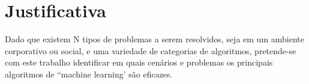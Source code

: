 \section{Justificativa}
\label{sec:justificativa}

Dado que existem N tipos de problemas a serem resolvidos, seja em um ambiente corporativo ou social, e uma variedade de categorias de algoritmos, pretende-se com este trabalho identificar em quais cenários e problemas os principais algoritmos de “machine learning’ são eficazes.